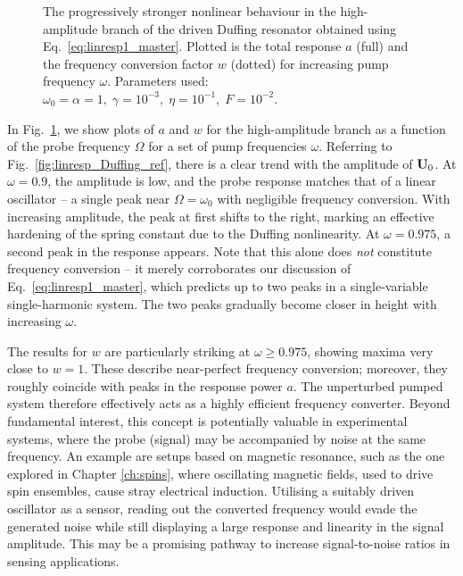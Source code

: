 \begin{figure} [h!]
	\centering
	
	\caption{The progressively stronger nonlinear behaviour in the high-amplitude branch of the driven Duffing resonator obtained using Eq.~\eqref{eq:linresp1_master}. Plotted is the total response $a$ (full) and the frequency conversion factor $w$ (dotted) for increasing pump frequency $\omega$. Parameters used: $\omega_0 = \alpha = 1, \; \gamma = 10^{-3} , \; \eta = 10^{-1},\; F = 10^{-2}$.}
	\label{fig:linresp_Duffing_hi} 
\end{figure}

In Fig.~\ref{fig:linresp_Duffing_hi}, we show plots of $a$ and $w$ for the high-amplitude branch as a function of the probe frequency $\Omega$ for a set of pump frequencies $\omega$. Referring to Fig.~\ref{fig:linresp_Duffing_ref}, there is a clear trend with the amplitude of $\vb{U}_0$. At $\omega=0.9$, the amplitude is low, and the probe response matches that of a linear oscillator -- a single peak near $\Omega = \omega_0$ with negligible frequency conversion. With increasing amplitude, the peak at first shifts to the right, marking an effective hardening of the spring constant due to the Duffing nonlinearity. At $\omega = 0.975$, a second peak in the response appears. Note that this alone does \textit{not} constitute frequency conversion -- it merely corroborates our discussion of Eq.~\eqref{eq:linresp1_master}, which predicts up to two peaks in a single-variable single-harmonic system. The two peaks gradually become closer in height with increasing $\omega$. 

The results for $w$ are particularly striking at $\omega \geq 0.975$, showing maxima very close to $w = 1$. These describe near-perfect frequency conversion; moreover, they roughly coincide with peaks in the response power $a$. The unperturbed pumped system therefore effectively acts as a highly efficient frequency converter. Beyond fundamental interest, this concept is potentially valuable in experimental systems, where the probe (signal) may be accompanied by noise at the same frequency. An example are setups based on magnetic resonance, such as the one explored in Chapter \ref{ch:spins}, where oscillating magnetic fields, used to drive spin ensembles, cause stray electrical induction. Utilising a suitably driven oscillator as a sensor, reading out the converted frequency would evade the generated noise while still displaying  a large response and linearity in the signal amplitude. This may be a promising pathway to increase signal-to-noise ratios in sensing applications.


